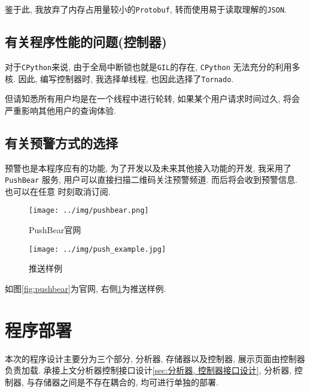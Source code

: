 鉴于此, 我放弃了内存占用量较小的\texttt{Protobuf},
转而使用易于读取理解的\texttt{JSON}.


\section{有关程序性能的问题(控制器)}

  对于\texttt{CPython}来说, 由于全局中断锁也就是\texttt{GIL}的存在, \texttt{CPython}
无法充分的利用多核. 因此, 编写控制器时, 我选择单线程, 也因此选择了\texttt{Tornado}.

但请知悉所有用户均是在一个线程中进行轮转, 如果某个用户请求时间过久,
将会严重影响其他用户的查询体验.

\section{有关预警方式的选择}

  预警也是本程序应有的功能, 为了开发以及未来其他接入功能的开发, 我采用了\texttt{PushBear}
服务, 用户可以直接扫描二维码关注预警频道. 而后将会收到预警信息. 也可以在任意
时刻取消订阅.

\begin{figure}[htbp]

\centering
\begin{minipage}{0.76\textwidth}

    \texttt{[image: ../img/pushbear.png]}
    \caption{PushBear官网}
    \label{fig:pushbear}

\end{minipage} \hfill
\begin{minipage}{0.22\textwidth}

\centering
    \texttt{[image: ../img/push\_example.jpg]}
    \caption{推送样例}
    \label{fig:push_example}
\end{minipage}

\end{figure}

如图\ref{fig:pushbear}为官网, 右侧\ref{fig:push_example}为推送样例.


\chapter{程序部署}

  本次的程序设计主要分为三个部分, 分析器, 存储器以及控制器, 展示页面由控制器
负责加载. 承接上文分析器控制接口设计\ref{sec:分析器, 控制器接口设计}, 分析器, 
控制器, 与存储器之间是不存在耦合的, 均可进行单独的部署.

